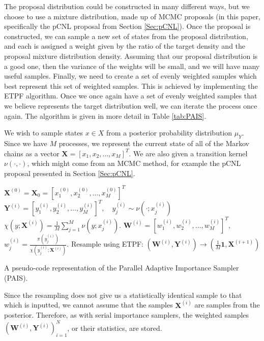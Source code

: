 \documentclass[final]{siamltex}
\newcommand{\X}{{\mathbf X}}
\newcommand{\Y}{{\mathbf Y}}
\newcommand{\W}{{\mathbf W}}
\begin{document}
The proposal distribution could be constructed in many different ways,
but we choose to use a mixture distribution, made up of MCMC proposals
(in this paper, specifically the pCNL proposal from Section \ref{Sec:pCNL}). Once the proposal is
constructed, we can sample a new set of states from the proposal
distribution, and each is assigned a weight given by the ratio of the target
density and the proposal mixture distribution density. Assuming that
our proposal distribution is a good one, then the variance of the
weights will be small, and we will have many useful samples. Finally, we
need to create a set of evenly weighted samples which best represent
this set of weighted samples. This is achieved by implementing the
ETPF algorithm. Once we once again have a set of evenly weighted
samples that we believe represents the target distribution well, we
can iterate the process once again. The algorithm is given in more detail in Table \ref{tab:PAIS}. 

We wish to sample states $x \in X$ from a posterior
probability distribution $\mu_Y$. Since we have $M$ processes, we
represent the current state of all of the Markov chains as a vector
$\X = [x_1,x_2,\ldots,x_M]^T$. We are also given a transition kernel
$\nu(\cdot,\cdot)$, which might come from an MCMC method, for example
the pCNL proposal presented in Section \ref{Sec:pCNL}.

\begin{table}
\begin{mdframed}
\begin{algorithmic}
\STATE $\X^{(0)} = \X_0 = [x_1^{(0)},x_2^{(0)},\ldots,x_M^{(0)}]^T$
\STATE $\Y^{(i)} = [y_1^{(i)},y_2^{(i)},\ldots,y_M^{(i)}]^T, \quad y_j^{(i)} \sim
\nu(\cdot;x_j^{(i)})$
\STATE $\chi(y;\X^{(i)}) = \frac{1}{M}
\sum_{j=1}^M \nu(y;x_j^{(i)})$.
\STATE $\W^{(i)} = [w_1^{(i)},w_2^{(i)},\ldots,w_M^{(i)}]^T,$ \quad $w^{(i)}_j =
\frac{\pi(y_j^{(i)})}{\chi(y_j^{(i)};\X^{(i)})}$.
\STATE Resample using ETPF: $(\W^{(i)},\Y^{(i)}) \rightarrow (\frac{1}{M}\mathbf{1}, \X^{(i+1)})$
\ENDFOR 
\end{algorithmic}
\end{mdframed}

\caption{A pseudo-code representation of the Parallel Adaptive
  Importance Sampler (PAIS).}
\label{tab:PAIS}
\end{table}

Since the resampling does not give us a statistically identical sample
to that which is inputted, we cannot assume that the samples $\X^{(i)}$
are samples from the posterior. Therefore, as with serial
importance samplers, the weighted samples
$(\W^{(i)},\Y^{(i)})_{i=1}^N$, or their statistics, are stored.
\end{document}
